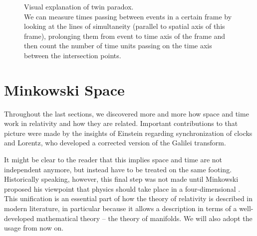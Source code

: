{\begin{figure}
	\caption{Visual explanation of twin paradox.\\
	We can measure times passing between events in a certain frame by looking at the lines of simultaneity (parallel to spatial axis of this frame), prolonging them from event to time axis of the frame and then count the number of time units passing on the time axis between the intersection points.}
	\label{fig:twin_paradox_doubleprime}
\end{figure}

}
\fi



\newpage



	\section{Minkowski Space}
Throughout the last sections, we discovered more and more how space and time work in relativity and how they are related. Important contributions to that picture were made by the insights of Einstein regarding synchronization of clocks and Lorentz, who developed a corrected version of the Galilei transform.

It might be clear to the reader that this implies space and time are not independent anymore, but instead have to be treated on the same footing. Historically speaking, however, this final step was not made until Minkowski proposed his viewpoint that physics should take place in a four-dimensional . This unification is an essential part of how the theory of relativity is described in modern literature, in particular because it allows a description in terms of a well-developed mathematical theory -- the theory of manifolds. We will also adopt the usage from now on.








